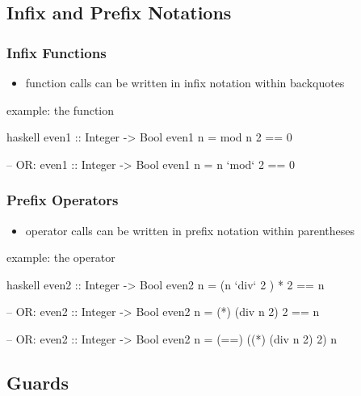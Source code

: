 \documentclass[dvipsnames]{beamer}
\theoremstyle{plain}
\begin{document}
\subsection{Infix and Prefix Notations}

\begin{frame}[fragile]
  \frametitle{Infix Functions}

  \begin{itemize}
    \item function calls can be written in infix notation within backquotes
  \end{itemize}

  \begin{exampleblock}{example: the  function}
    \begin{pygments}{haskell}
even1 :: Integer -> Bool
even1 n = mod n 2 == 0

-- OR:
even1 :: Integer -> Bool
even1 n = n `mod` 2 == 0
    \end{pygments}
  \end{exampleblock}
\end{frame}

\begin{frame}[fragile]
  \frametitle{Prefix Operators}

  \begin{itemize}
    \item operator calls can be written in prefix notation within parentheses
  \end{itemize}

  \begin{exampleblock}{example: the  operator}
    \begin{pygments}{haskell}
even2 :: Integer -> Bool
even2 n = (n `div` 2 ) * 2 == n

-- OR:
even2 :: Integer -> Bool
even2 n = (*) (div n 2) 2 == n

-- OR:
even2 :: Integer -> Bool
even2 n = (==) ((*) (div n 2) 2) n
    \end{pygments}
  \end{exampleblock}
\end{frame}

\subsection{Guards}
\end{document}
